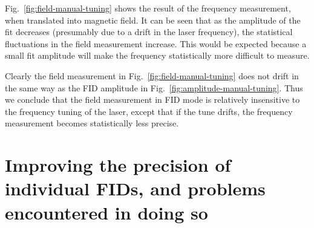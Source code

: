 Fig.~\ref{fig:field-manual-tuning} shows the result of the frequency
measurement, when translated into magnetic field.  It can be seen that
as the amplitude of the fit decreases (presumably due to a drift in
the laser frequency), the statistical fluctuations in the field
measurement increase.  This would be expected because a small fit
amplitude will make the frequency statistically more difficult to
measure.

Clearly the field measurement in Fig.~\ref{fig:field-manual-tuning}
does not drift in the same way as the FID amplitude in
Fig.~\ref{fig:amplitude-manual-tuning}.  Thus we conclude that the
field measurement in FID mode is relatively insensitive to the
frequency tuning of the laser, except that if the tune drifts, the
frequency measurement becomes statistically less precise.



\section{Improving the precision of individual FIDs, and problems encountered in doing so\label{sec:reference-frequency}}

